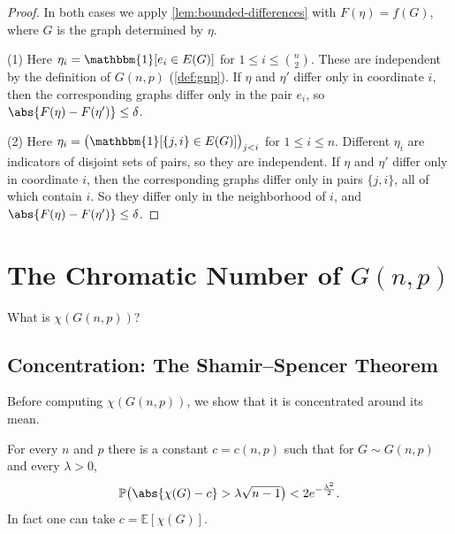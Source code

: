 \begin{proof}
    In both cases we apply \autoref{lem:bounded-differences} with \(F(\eta) = f(G)\), where \(G\) is the graph determined by \(\eta\).

    (1) Here \(\eta_{i} = \mathbbm{1}[e_{i} \in E(G)]\) for \(1 \le i \le \binom{n}{2}\). These are independent by the definition of \(G(n, p)\) (\autoref{def:gnp}). If \(\eta\) and \(\eta'\) differ only in coordinate \(i\), then the corresponding graphs differ only in the pair \(e_{i}\), so \(\abs{F(\eta) - F(\eta')} \le \delta\).

    (2) Here \(\eta_{i} = \bigl( \mathbbm{1}[\{j, i\} \in E(G)] \bigr)_{j < i}\) for \(1 \le i \le n\). Different \(\eta_{i}\) are indicators of disjoint sets of pairs, so they are independent. If \(\eta\) and \(\eta'\) differ only in coordinate \(i\), then the corresponding graphs differ only in pairs \(\{j, i\}\), all of which contain \(i\). So they differ only in the neighborhood of \(i\), and \(\abs{F(\eta) - F(\eta')} \le \delta\).
\end{proof}

\section{The Chromatic Number of \texorpdfstring{\(G(n,p)\)}{G(n,p)}}\label{sec:chi-gnp}

\begin{question}\label{q:chi-gnp}
    What is \(\chi(G(n,p))\)?
\end{question}

\subsection{Concentration: The Shamir--Spencer Theorem}\label{sec:shamir-spencer}

Before computing \(\chi(G(n,p))\), we show that it is concentrated around its mean.

\begin{theorem}\label{thm:shamir-spencer}
    For every \(n\) and \(p\) there is a constant \(c = c(n, p)\) such that for \(G \sim G(n, p)\) and every \(\lambda > 0\),
    \[
        \mathbb{P}\bigl( \abs{\chi(G) - c} > \lambda \sqrt{n-1} \bigr) < 2 e^{-\frac{\lambda^{2}}{2}} .
    \]
    In fact one can take \(c = \mathbb{E}[\chi(G)]\).
\end{theorem}

